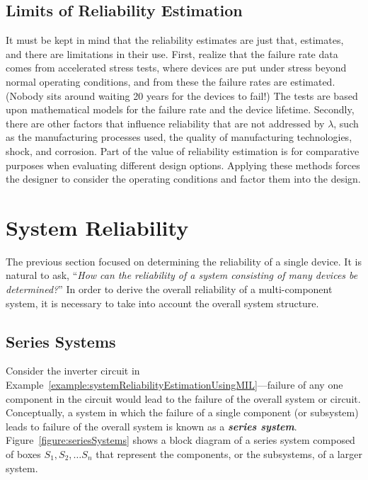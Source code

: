 {\subsection{Limits of Reliability Estimation}
\label{subsection:limits-of-reliability-estimation}

It must be kept in mind that the reliability estimates are just that,
estimates, and there are limitations in their use. First, realize that
the failure rate data comes from accelerated stress tests, where devices
are put under stress beyond normal operating conditions, and from these
the failure rates are estimated. (Nobody sits around waiting 20 years
for the devices to fail!) The tests are based upon mathematical models
for the failure rate and the device lifetime. Secondly, there are other
factors that influence reliability that are not addressed by $\lambda$,
such as the manufacturing processes used, the quality of manufacturing
technologies, shock, and corrosion. Part of the value of reliability
estimation is for comparative purposes when evaluating different design
options. Applying these methods forces the designer to consider the
operating conditions and factor them into the design.

\section{System Reliability}
\label{section:system-reliability-1}

The previous section focused on determining the reliability of a single
device. It is natural to ask, ``\emph{How can the reliability of a
system consisting of many devices be determined?}'' In order to derive
the overall reliability of a multi-component system, it is necessary to
take into account the overall system structure.

\subsection{Series Systems}
\label{subsection:series-systems}

Consider the inverter circuit in 
Example~\ref{example:systemReliabilityEstimationUsingMIL}---failure of any one
component in the circuit would lead to the failure of the overall system
or circuit. Conceptually, a system in which the failure of a single
component (or subsystem) leads to failure of the overall system is known
as a \emph{\textbf{series system}}. Figure~\ref{figure:seriesSystems}
shows a block diagram of a series system composed of boxes
$S_1, S_2, \ldots S_n$ that represent the components,
or the subsystems, of a larger system.

}

